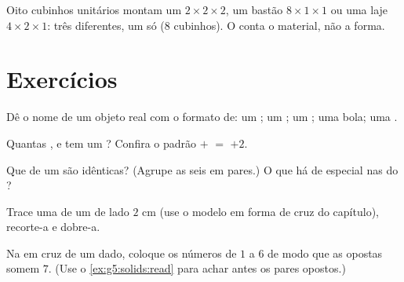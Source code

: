 \begin{example}\label{ex:g5:solids:rearrange}
Oito cubinhos unitários montam um  $2 \times 2 \times 2$, um
bastão $8 \times 1 \times 1$ ou uma laje $4 \times 2 \times 1$: três
 diferentes, um só  ($8$ cubinhos). O  conta o
material, não a forma.
\end{example}

\section{Exercícios}

\begin{exercise}[$\star$]\label{exo:g5:solids:1}
Dê o nome de um objeto real com o formato de: um ; um ; um ; uma bola; uma .
\end{exercise}

\begin{exercise}[$\star$]\label{exo:g5:solids:2}
Quantas ,  e  tem um ? Confira o
padrão  $+$  $=$  $+ 2$.
\end{exercise}

\begin{exercise}[$\star$]\label{exo:g5:solids:3}
Que  de um  são idênticas? (Agrupe as seis 
em pares.) O que há de especial nas  do ?
\end{exercise}

\begin{exercise}[$\star$]\label{exo:g5:solids:4}
Trace uma  de um  de lado $2$ cm (use o modelo em
forma de cruz do capítulo), recorte-a e dobre-a.
\end{exercise}

\begin{exercise}[$\star$]\label{exo:g5:solids:5}
Na  em cruz de um dado, coloque os números de $1$ a $6$
de modo que as  opostas somem $7$. (Use o
\cref{ex:g5:solids:read} para achar antes os pares opostos.)
\end{exercise}

